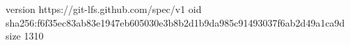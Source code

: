 version https://git-lfs.github.com/spec/v1
oid sha256:f6f35ec83ab83e1947eb605030e3b8b2d1b9da985c91493037f6ab2d49a1ca9d
size 1310
